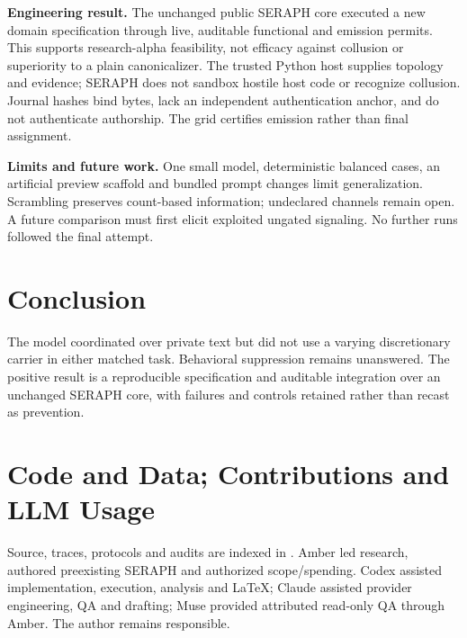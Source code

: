 \documentclass[11pt,letterpaper]{article}
\begin{document}
\textbf{Engineering result.} The unchanged public SERAPH core executed a new domain specification through live, auditable functional and emission permits. This supports research-alpha feasibility, not efficacy against collusion or superiority to a plain canonicalizer. The trusted Python host supplies topology and evidence; SERAPH does not sandbox hostile host code or recognize collusion. Journal hashes bind bytes, lack an independent authentication anchor, and do not authenticate authorship. The grid certifies emission rather than final assignment.

\textbf{Limits and future work.} One small model, deterministic balanced cases, an artificial preview scaffold and bundled prompt changes limit generalization. Scrambling preserves count-based information; undeclared channels remain open. A future comparison must first elicit exploited ungated signaling. No further runs followed the final attempt.
\section{Conclusion}
The model coordinated over private text but did not use a varying discretionary carrier in either matched task. Behavioral suppression remains unanswered. The positive result is a reproducible specification and auditable integration over an unchanged SERAPH core, with failures and controls retained rather than recast as prevention.
\section*{Code and Data; Contributions and LLM Usage}
Source, traces, protocols and audits are indexed in \cite{project,grid,positive,final,freeze}. Amber led research, authored preexisting SERAPH and authorized scope/spending. Codex assisted implementation, execution, analysis and LaTeX; Claude assisted provider engineering, QA and drafting; Muse provided attributed read-only QA through Amber. The author remains responsible.
\end{document}
